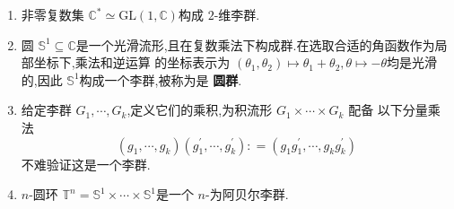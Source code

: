 \documentclass[../../几何与拓扑.tex]{subfiles}
\begin{document}
\begin{example}[李群的例子]
\begin{enumerate}
        \item  非零复数集 \(  \mathbb{C}^{*}  \simeq \mathrm{GL}\left( 1,\mathbb{C}  \right) \)构成 \(  2  \)-维李群.
        \item 圆 \(  \mathbb{S}^{1}\subseteq \mathbb{C}  \)是一个光滑流形,且在复数乘法下构成群.在选取合适的角函数作为局部坐标下,乘法和逆运算
        的坐标表示为 \(  \left( \theta _1 , \theta _2  \right)\mapsto  \theta _1 +  \theta _2 , \theta \mapsto - \theta    \)均是光滑的,因此 \(  \mathbb{S}^{1}  \)构成一个李群,被称为是 \textbf{圆群}.
        \item 给定李群 \(   G_1,\cdots,G_k   \),定义它们的乘积,为积流形 \(  G_1\times \cdots \times G_{k}  \)                   配备
        以下分量乘法 \[
        \left(  g_1,\cdots,g_k  \right) \left( g_1^{\prime} ,\cdots ,g_{k}^{\prime}  \right): =  \left( g_1g_1^{\prime} ,\cdots ,g_{k}g_{k}^{\prime}  \right)   
        \]不难验证这是一个李群.
        \item \(  n  \)-圆环 \(  \mathbb{T}^{n}=  \mathbb{S}^{1}\times \cdots \times \mathbb{S}^{1}  \)是一个 \(  n  \)-为阿贝尔李群.   
    \end{enumerate}
    
\end{example}

\hspace*{\fill} 
\end{document}
